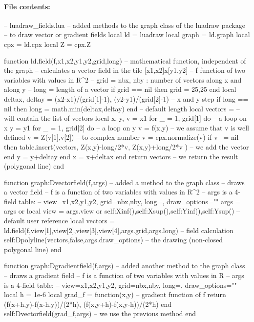 \paragraph{File contents:}
\begin{Luacode}
-- luadraw_fields.lua
-- added methods to the graph class of the luadraw package
-- to draw vector or gradient fields
local ld = luadraw
local graph = ld.graph
local cpx = ld.cpx
local Z = cpx.Z

function ld.field(f,x1,x2,y1,y2,grid,long)  -- mathematical function, independent of the graph
-- calculates a vector field in the tile [x1,x2]x[y1,y2]
-- f function of two variables with values ​​in R^2
-- grid = {nbx, nby} : number of vectors along x and along y
-- long = length of a vector
    if grid == nil then grid = {25,25} end
    local deltax, deltay = (x2-x1)/(grid[1]-1), (y2-y1)/(grid[2]-1) -- x and y step
    if long == nil then long = math.min(deltax,deltay) end -- default length
    local vectors = {} -- will contain the list of vectors
    local x, y, v = x1 
    for _ = 1, grid[1] do -- a loop on x
        y = y1
        for _ = 1, grid[2] do -- a loop on y
            v = f(x,y) -- we assume that v is well defined
            v = Z(v[1],v[2]) -- to complex number
            v = cpx.normalize(v)
            if v ~= nil then
                table.insert(vectors, {Z(x,y)-long/2*v, Z(x,y)+long/2*v} ) -- we add the vector
            end
            y = y+deltay
        end
        x = x+deltax
    end
    return vectors -- we return the result (polygonal line)
end

function graph:Dvectorfield(f,args) -- added a method to the graph class
-- draws a vector field
-- f is a function of two variables with values ​​in R^2
-- args is a 4-field table:
-- { view={x1,x2,y1,y2}, grid={nbx,nby}, long=, draw_options=""}
    args = args or {}
    local view = args.view or {self:Xinf(),self:Xsup(),self:Yinf(),self:Ysup()} -- default user reference
    local vectors = ld.field(f,view[1],view[2],view[3],view[4],args.grid,args.long) -- field calculation
    self:Dpolyline(vectors,false,args.draw_options) -- the drawing (non-closed polygonal line)
end

function graph:Dgradientfield(f,args) -- added another method to the graph class
-- draws a gradient field
-- f is a function of two variables with values ​​in R
-- args is a 4-field table:
-- { view={x1,x2,y1,y2}, grid={nbx,nby}, long=, draw_options=""}
    local h = 1e-6
    local grad_f = function(x,y) -- gradient function of f
        return { (f(x+h,y)-f(x-h,y))/(2*h), (f(x,y+h)-f(x,y-h))/(2*h) }
    end
    self:Dvectorfield(grad_f,args) -- we use the previous method
end
\end{Luacode}

